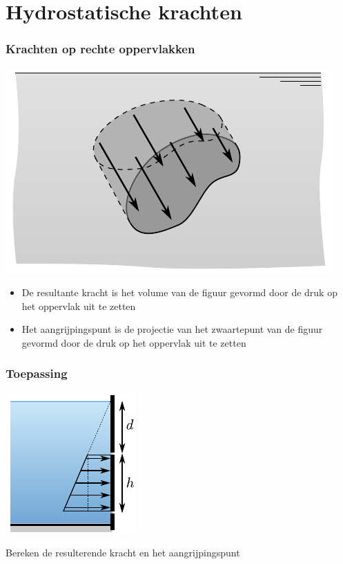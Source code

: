 \documentclass[t]{beamer}
\begin{document}
  	\section{Hydrostatische krachten}		
		\begin{frame}
			\frametitle{Krachten op rechte oppervlakken}
			\center
			\includegraphics[scale=0.9]{fig/hydrostatica/grafische_weergave_integraal}
			\begin{itemize}
				\pause
				\item De resultante kracht is het volume van de figuur gevormd door de druk op het oppervlak uit te zetten
				\pause
				\item Het aangrijpingspunt is de projectie van het zwaartepunt van de figuur gevormd door de druk op het oppervlak uit te zetten
			\end{itemize}
  		\end{frame}
  		\begin{frame}
			\frametitle{Toepassing}
			\vspace{1cm}
			\center
			\includegraphics{fig/hydrostatica/kracht_op_luik}
			
			Bereken de resulterende kracht en het aangrijpingspunt
		\end{frame}
\end{document}
